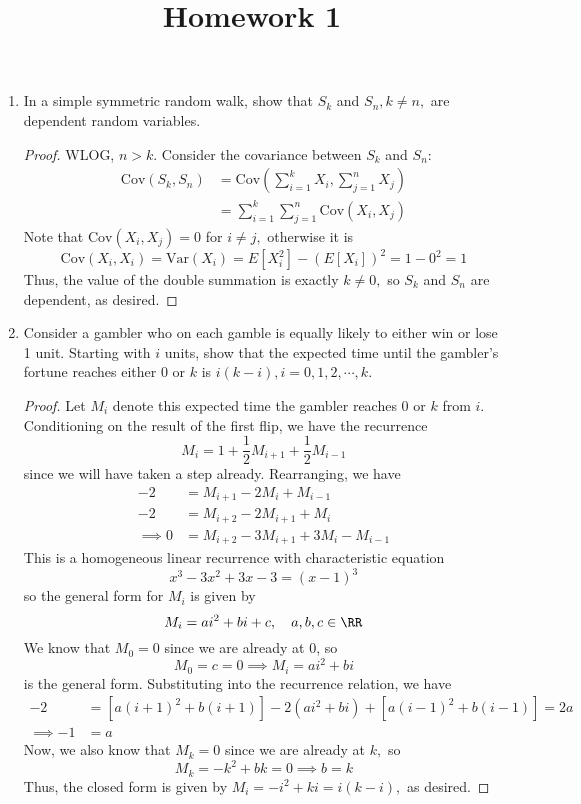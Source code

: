 \documentclass{article}
\newcommand{\var}{\mathrm{Var}}
\newcommand{\cov}{\mathrm{Cov}}
\begin{document}
\title{Homework 1}
\maketitle
\thispagestyle{fancy}

\begin{enumerate}
	\item In a simple symmetric random walk, show that $S_k$ and $S_n, k\neq n,$ are dependent random variables.
		\begin{proof}
			WLOG, $n>k.$ Consider the covariance between $S_k$ and $S_n:$
			\begin{align*}
				\cov(S_k, S_n) &= \cov\left( \sum_{i=1}^{k}X_i, \sum_{j=1}^{n} X_j \right) \\
				&= \sum_{i=1}^{k} \sum_{j=1}^{n} \cov(X_i, X_j)
			\end{align*}
			Note that $\cov(X_i, X_j)=0$ for $i\neq j,$ otherwise it is
			\[\cov(X_i, X_i)=\var(X_i)=E[X_i^2]-(E[X_i])^2 = 1 - 0^2 = 1\]
			Thus, the value of the double summation is exactly $k\neq 0,$ so $S_k$ and $S_n$ are dependent, as desired.
		\end{proof}

	\item Consider a gambler who on each gamble is equally likely to either win or lose 1 unit. Starting with $i$ units, show that the expected time until the gambler's fortune reaches either $0$ or $k$ is $i(k-i), i=0, 1, 2, \cdots, k.$
		\begin{proof}
			Let $M_i$ denote this expected time the gambler reaches 0 or $k$ from $i.$ Conditioning on the result of the first flip, we have the recurrence
			\[M_i=1+\frac{1}{2}M_{i+1}+\frac{1}{2}M_{i-1}\]
			since we will have taken a step already. Rearranging, we have
			\begin{align*}
				-2 &= M_{i+1}-2M_i+M_{i-1} \\
				-2 &= M_{i+2}-2M_{i+1}+M_i \\
				\implies 0 &= M_{i+2}-3M_{i+1}+3M_i-M_{i-1}
			\end{align*}
			This is a homogeneous linear recurrence with characteristic equation
			\[x^3-3x^2+3x-3 = (x-1)^3\]
			so the general form for $M_i$ is given by
			\[M_i= ai^2+bi+c, \quad a, b, c\in \RR\]
			We know that $M_0=0$ since we are already at 0, so
			\[M_0=c=0\implies M_i=ai^2+bi\]
			is the general form. Substituting into the recurrence relation, we have
			\begin{align*}
				-2 &= \left[ a(i+1)^2+b(i+1) \right] - 2\left( ai^2+bi \right) + \left[ a(i-1)^2+b(i-1) \right] = 2a \\
				\implies -1 &= a
			\end{align*}
			Now, we also know that $M_k=0$ since we are already at $k,$ so
			\[M_k=-k^2+bk=0\implies b=k\]
			Thus, the closed form is given by $M_i=-i^2+ki=i(k-i),$ as desired.
		\end{proof}


\end{enumerate}
\end{document}
